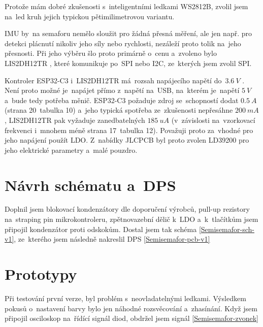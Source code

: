 Protože mám dobré zkušenosti s~inteligentními ledkami WS2812B, zvolil jsem na~led kruh jejich typickou pětimilimetrovou variantu.

IMU by~na semaforu nemělo sloužit pro žádná přesná měření, ale jen např. pro detekci plácnutí nikoliv jeho síly nebo rychlosti, nezáleží proto tolik na~jeho přesnosti.
Při jeho výběru šlo proto primárně o~cenu a~zvoleno bylo LIS2DH12TR \cite{LIS2DH12TR}, které komunikuje po~SPI nebo I2C, ze~kterých jsem zvolil SPI.

Kontroler ESP32-C3 i~LIS2DH12TR má~rozsah napájecího napětí do~\(3.6~V\) \cite{ESP32C3}\cite{LIS2DH12TR}.
Není proto možné je~napájet přímo z~napětí na~USB, na~kterém je~napětí \(5~V\) a~bude tedy potřeba měnič.
ESP32-C3 požaduje zdroj se~schopností dodat \(0.5~A\) \cite{ESP32C3} (strana 20~tabulka 10) a~jeho typická spotřeba ze~zkušenosti nepřesáhne \(200~mA\), LIS2DH12TR pak vyžaduje zanedbatelných \(185~uA\) (v~závislosti na~vzorkovací frekvenci i~mnohem méně \cite{LIS2DH12TR} strana 17~tabulka 12).
Považuji proto za~vhodné pro jeho napájení použít LDO.
Z~nabídky JLCPCB byl proto zvolen LD39200 \cite{LD39200} pro jeho elektrické parametry a~malé pouzdro.

\section{Návrh schématu a~DPS}

Doplnil jsem blokovací kondenzátory dle doporučení výrobců, pull-up rezistory na~straping pin mikrokontroleru, zpětnovazební dělič k~LDO a~k~tlačítkům jsem připojil kondenzátor proti odskokům.
Dostal jsem tak schéma \ref{Semisemafor-sch-v1}, ze~kterého jsem následně nakreslil DPS \ref{Semisemafor-pcb-v1}

\section{Prototypy}

Při testování první verze, byl problém s~neovladatelnými ledkami.
Výsledkem pokusů o~nastavení barvy bylo jen náhodné rozsvěcování a~zhasínání.
Když jsem připojil osciloskop na~řídící signál diod, obdržel jsem signál \ref{Semisemafor-zvonek} %

